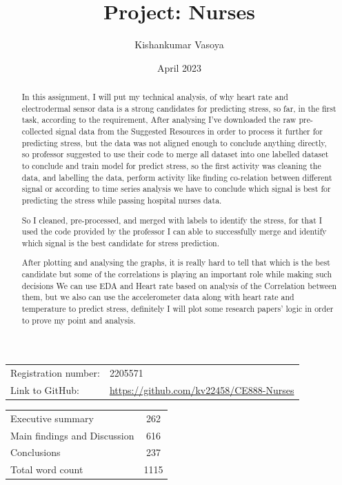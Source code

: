 \documentclass{article}
\author{Kishankumar Vasoya}
\date{April 2023}
\title{Project: Nurses}
\begin{document}
\maketitle

\begin{table}[h]
    \centering
    \begin{tabular}{ll}
        Registration number: &2205571\\
        Link to GitHub: & \url{https://github.com/kv22458/CE888-Nurses}\\
    \end{tabular}
\end{table}



\begin{table}[h]
    \centering
    \begin{tabular}{lc}
        Executive summary & {262}\\
        Main findings and Discussion & {616}\\
        Conclusions & {237}\\
        \hline
        Total word count & {1115}\\
    \end{tabular}
\end{table}

\tableofcontents

\clearpage


\begin{abstract}
In this assignment, I will put my technical analysis, of why heart rate and electrodermal sensor data is a strong candidates for predicting stress, so far, in the first task, according to the requirement, After analysing I've downloaded the raw pre-collected signal data from the Suggested Resources\cite{Hosseini2022} in order to process it further for predicting stress, but the data was not aligned enough to conclude anything directly, so professor suggested to use their code to merge all dataset into one labelled dataset to conclude and train model for predict stress, so the first activity was cleaning the data, and labelling the data, perform activity like finding co-relation between different signal or according to time series analysis we have to conclude which signal is best for predicting the stress while passing hospital nurses data.\cite{Hosseini2022}

So I cleaned, pre-processed, and merged with labels to identify the stress, for that I used the code provided by the professor I can able to successfully merge and identify which signal is the best candidate for stress prediction.

After plotting and analysing the graphs, it is really hard to tell that which is the best candidate but some of the correlations is playing an important role while making such decisions
We can use EDA and Heart rate based on analysis of the Correlation between them, but we also can use the accelerometer data along with heart rate and temperature to predict stress, definitely I will plot some research papers' logic in order to prove my point and analysis.
\end{abstract}
\end{document}
